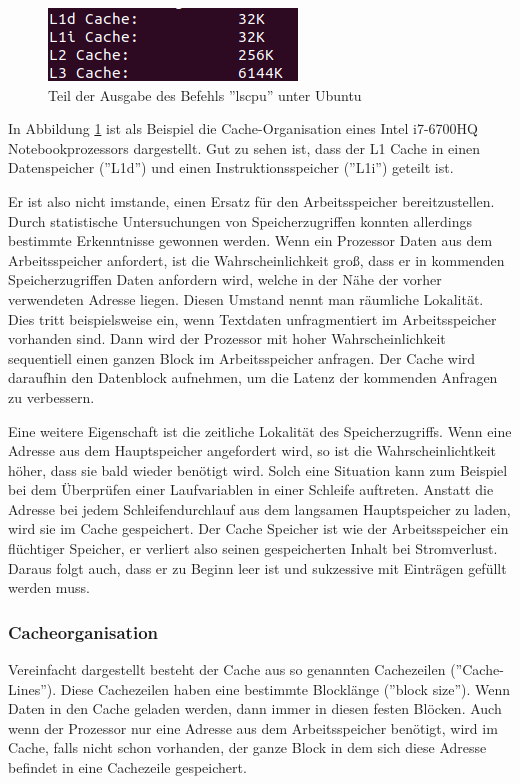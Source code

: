 \documentclass[a4paper,12pt]{article}
\begin{document}
\begin{figure}[!htb]
\centering
\includegraphics[scale=0.5]{lscpu}
\caption{Teil der Ausgabe des Befehls ''lscpu'' unter Ubuntu}
\centering
\label{fig:lscpu}
\end{figure}

\noindent In Abbildung \ref{fig:lscpu} ist als Beispiel die Cache-Organisation eines Intel i7-6700HQ Notebookprozessors dargestellt. Gut zu sehen ist, dass der L1 Cache in einen Datenspeicher (''L1d'') und einen Instruktionsspeicher (''L1i'') geteilt ist. 

\noindent Er ist also nicht imstande, einen Ersatz für den Arbeitsspeicher bereitzustellen. Durch statistische Untersuchungen von Speicherzugriffen konnten allerdings bestimmte Erkenntnisse gewonnen werden. Wenn ein Prozessor Daten aus dem Arbeitsspeicher anfordert, ist die Wahrscheinlichkeit groß, dass er in kommenden Speicherzugriffen Daten anfordern wird, welche in der Nähe der vorher verwendeten Adresse liegen. Diesen Umstand nennt man räumliche Lokalität. Dies tritt beispielsweise ein, wenn Textdaten unfragmentiert im Arbeitsspeicher vorhanden sind. Dann wird der Prozessor mit hoher Wahrscheinlichkeit sequentiell einen ganzen Block im Arbeitsspeicher anfragen. Der Cache wird daraufhin den Datenblock aufnehmen, um die Latenz der kommenden Anfragen zu verbessern. 

\noindent Eine weitere Eigenschaft ist die zeitliche Lokalität des Speicherzugriffs. Wenn eine Adresse aus dem Hauptspeicher angefordert wird, so ist die Wahrscheinlichtkeit höher, dass sie bald wieder benötigt wird. Solch eine Situation kann zum Beispiel bei dem Überprüfen einer Laufvariablen in einer Schleife auftreten. Anstatt die Adresse bei jedem Schleifendurchlauf aus dem langsamen Hauptspeicher zu laden, wird sie im Cache gespeichert. 
Der Cache Speicher ist wie der Arbeitsspeicher ein flüchtiger Speicher, er verliert also seinen gespeicherten Inhalt bei Stromverlust. Daraus folgt auch, dass er zu Beginn leer ist und sukzessive mit Einträgen gefüllt werden muss.\cite[S.180-188]{mikroprozessortechnik2011}
\subsubsection{Cacheorganisation}
Vereinfacht dargestellt besteht der Cache aus so genannten Cachezeilen (''Cache-Lines''). Diese Cachezeilen haben eine bestimmte Blocklänge (''block size'')\cite[S.183]{mikroprozessortechnik2011}. Wenn Daten in den Cache geladen werden, dann immer in diesen festen Blöcken. Auch wenn der Prozessor nur eine Adresse aus dem Arbeitsspeicher benötigt, wird im Cache, falls nicht schon vorhanden, der ganze Block in dem sich diese Adresse befindet in eine Cachezeile gespeichert.
\end{document}
